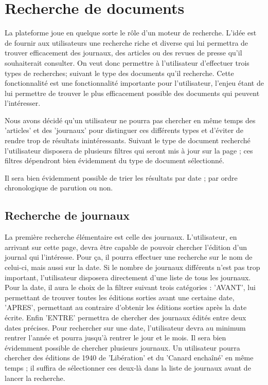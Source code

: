 \section{Recherche de documents}
\label{sec:recherche}

La plateforme joue en quelque sorte le rôle d'un moteur de recherche. L'idée est de fournir aux utilisateurs une recherche riche et diverse qui lui permettra de trouver efficacement des journaux, des articles ou des revues de presse qu'il souhaiterait consulter. On veut donc permettre à l'utilisateur d'effectuer trois types de recherches; suivant le type des documents qu'il recherche. Cette fonctionnalité est une fonctionnalité importante pour l'utilisateur, l'enjeu étant de lui permettre de trouver le plus efficacement possible des documents qui peuvent l'intéresser.

Nous avons décidé qu'un utilisateur ne pourra pas chercher en même temps des 'articles' et des 'journaux' pour distinguer ces différents types et d'éviter de rendre trop de résultats inintéressants. Suivant le type de document recherché l'utilisateur disposera de plusieurs filtres qui seront mis à jour sur la page ; ces filtres dépendront bien évidemment du type de document sélectionné.

Il sera bien évidemment possible de trier les résultats par date ; par ordre chronologique de parution ou non.

\subsection{Recherche de journaux}
\label{sec:recherche_journal}

La première recherche élémentaire est celle des journaux. L'utilisateur, en arrivant sur cette page, devra être capable de pouvoir chercher l'édition d'un journal qui l'intéresse. Pour ça, il pourra effectuer une recherche sur le nom de celui-ci, mais aussi sur la date. Si le nombre de journaux différents n'est pas trop important, l'utilisateur disposera directement d'une liste de tous les journaux. Pour la date, il aura le choix de la filtrer suivant trois catégories : 'AVANT', lui permettant de trouver toutes les éditions sorties avant une certaine date, 'APRES', permettant au contraire d'obtenir les éditions sorties après la date écrite. Enfin 'ENTRE' permettra de chercher des journaux édités entre deux dates précises. Pour rechercher sur une date, l'utilisateur devra au minimum rentrer l'année et pourra jusqu'à rentrer le jour et le mois. Il sera bien évidemment possible de chercher plusieurs journaux. Un utilisateur pourra chercher des éditions de 1940 de 'Libération' et du 'Canard enchaîné' en même temps ; il suffira de sélectionner ces deux-là dans la liste de journaux avant de lancer la recherche.

